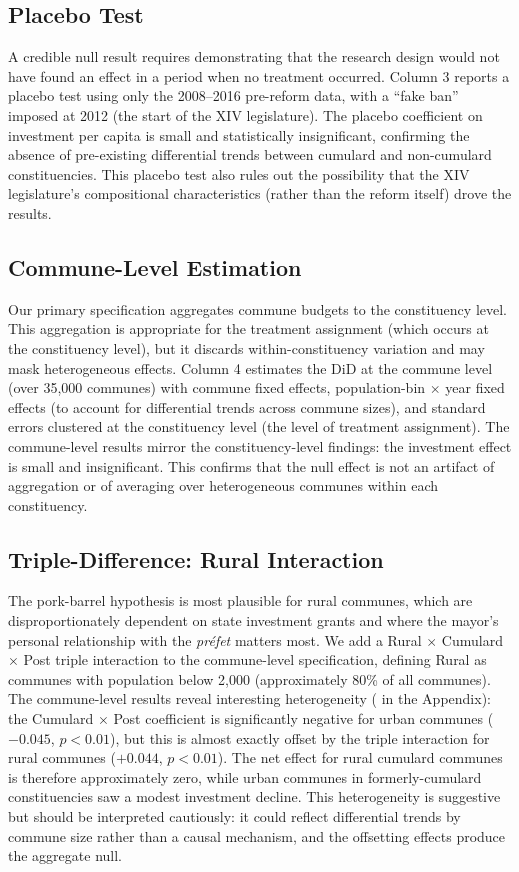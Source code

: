 \documentclass[12pt]{article}
\begin{document}
\subsection{Placebo Test}

A credible null result requires demonstrating that the research design would not have found an effect in a period when no treatment occurred. Column 3 reports a placebo test using only the 2008--2016 pre-reform data, with a ``fake ban'' imposed at 2012 (the start of the XIV legislature). The placebo coefficient on investment per capita is small and statistically insignificant, confirming the absence of pre-existing differential trends between cumulard and non-cumulard constituencies. This placebo test also rules out the possibility that the XIV legislature's compositional characteristics (rather than the reform itself) drove the results.

\subsection{Commune-Level Estimation}

Our primary specification aggregates commune budgets to the constituency level. This aggregation is appropriate for the treatment assignment (which occurs at the constituency level), but it discards within-constituency variation and may mask heterogeneous effects. Column 4 estimates the DiD at the commune level (over 35,000 communes) with commune fixed effects, population-bin $\times$ year fixed effects (to account for differential trends across commune sizes), and standard errors clustered at the constituency level (the level of treatment assignment). The commune-level results mirror the constituency-level findings: the investment effect is small and insignificant. This confirms that the null effect is not an artifact of aggregation or of averaging over heterogeneous communes within each constituency.

\subsection{Triple-Difference: Rural Interaction}

The pork-barrel hypothesis is most plausible for rural communes, which are disproportionately dependent on state investment grants and where the mayor's personal relationship with the \textit{préfet} matters most. We add a Rural $\times$ Cumulard $\times$ Post triple interaction to the commune-level specification, defining Rural as communes with population below 2,000 (approximately 80\% of all communes). The commune-level results reveal interesting heterogeneity ( in the Appendix): the Cumulard $\times$ Post coefficient is significantly negative for urban communes ($-0.045$, $p < 0.01$), but this is almost exactly offset by the triple interaction for rural communes ($+0.044$, $p < 0.01$). The net effect for rural cumulard communes is therefore approximately zero, while urban communes in formerly-cumulard constituencies saw a modest investment decline. This heterogeneity is suggestive but should be interpreted cautiously: it could reflect differential trends by commune size rather than a causal mechanism, and the offsetting effects produce the aggregate null.
\end{document}
